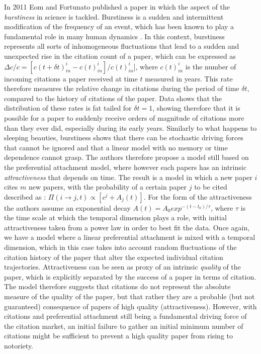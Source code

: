 In 2011 Eom and Fortunato  \cite{10.1371/journal.pone.0024926} published a paper in which the aspect of the \textit{burstiness} in science is tackled. Burstiness is a sudden and intermittent modification of the 
frequency of an event,  which has been known to play a fundamental role in many human dynamics \cite{0295-5075-81-4-48002,PhysRevE.83.025102}. In this context, burstiness represents all sorts of inhomogeneous fluctuations that
lead to a sudden and unexpected rise in the citation count of a paper, which can be expressed as $ \Delta c/c = [c(t+\delta t)^{i}_{in} - c(t)^{i}_{in}]/c(t)^{i}_{in}] $, where $c(t)^{i}_{in}$ is the number of incoming citations
a paper received at time $t$ measured in years. This rate therefore measures the relative change in citations during the period of time $\delta t$, compared to the history of citations of the paper. Data shows that the distribution
of these rates is fat tailed for $\delta t = 1$, showing therefore that it is possible for a paper to suddenly receive orders of magnitude of citations more than they ever did, especially during its early years. Similarly to what happens to sleeping beauties, burstiness shows that there can be stochastic driving forces that cannot be ignored and that a linear model with no memory
or time dependence cannot grasp. The authors therefore propose a model still based on the preferential attachment model, where however each papers has an intrinsic \textit{attractiveness} that depends on time. The result is a model in which a new paper $i$
cites $m$ new papers, with the probability of a certain paper $j$ to be cited described as : $\Pi(i \rightarrow j ,t) \propto [ c^{j} + A_{j}(t)] $. For the form
of the attractiveness the authors assume an exponential decay $A(t) = A_{0} exp^{-(t-t_{0})/\tau}$, where $\tau$ is the time scale at which the temporal dimension plays a role, with initial attractiveness taken from a power law in order 
to best fit the data. Once again, we have a model
where a linear preferential attachment is mixed with a temporal dimension, which in this case takes into account random fluctuations of the citation history of the paper that
alter the expected individual citation trajectories. Attractiveness can be seen as proxy of an intrinsic \textit{quality} of the paper, which is explicitly separated by the success of a paper in terms
of citation. The model therefore suggests that citations do not represent the absolute measure of the quality of the paper, but that rather they are a probable (but not guaranteed) consequence
of papers of high quality (attractiveness). However, with citations and preferential attachment still being a fundamental driving force of the citation market, an initial failure to gather an initial minimum number
of citations might be sufficient to prevent a high quality paper from rising to notoriety. 

